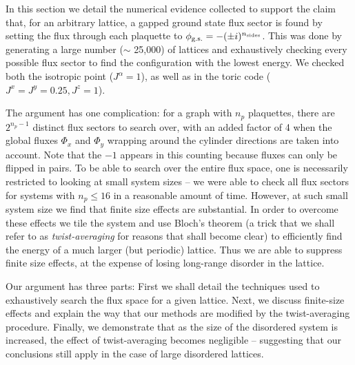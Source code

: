 In this section we detail the numerical evidence collected to support the claim that, for an arbitrary lattice, a gapped ground state flux sector is found by setting the flux through each plaquette to $\phi_{\textup{g.s.}} = -(\pm i)^{n_{\textup{sides}}}$. This was done by generating a large number ($\sim$ 25,000) of lattices and exhaustively checking every possible flux sector to find the configuration with the lowest energy. We checked both the isotropic point ($J^\alpha = 1$), as well as in the toric code ($J^x = J^y = 0.25, J^z = 1$).\par
The argument has one complication: for a graph with $n_p$ plaquettes, there are $2^{n_p - 1}$ distinct flux sectors to search over, with an added factor of 4 when the global fluxes $\Phi_x$ and $\Phi_y$ wrapping around the cylinder directions are taken into account. Note that the $-1$ appears in this counting because fluxes can only be flipped in pairs. To be able to search over the entire flux space, one is necessarily restricted to looking at small system sizes -- we were able to check all flux sectors for systems with $n_p \leq 16$ in a reasonable amount of time. However, at such small system size we find that finite size effects are substantial. In order to overcome these effects we tile the system and use Bloch's theorem (a trick that we shall refer to as \textit{twist-averaging} for reasons that shall become clear) to efficiently find the energy of a much larger (but periodic) lattice. Thus we are able to suppress finite size effects, at the expense of losing long-range disorder in the lattice.\par
Our argument has three parts: First we shall detail the techniques used to exhaustively search the flux space for a given lattice. Next, we discuss finite-size effects and explain the way that our methods are modified by the twist-averaging procedure. Finally, we demonstrate that as the size of the disordered system is increased, the effect of twist-averaging becomes negligible -- suggesting that our conclusions still apply in the case of large disordered lattices. 

